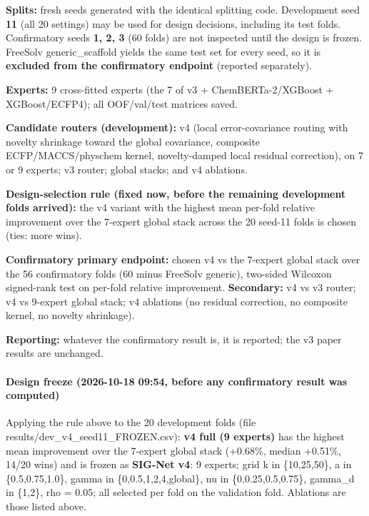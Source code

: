 \documentclass[11pt]{article}
\begin{document}
{\textbf{Splits:} fresh seeds generated with the identical splitting code. Development seed \textbf{11} (all 20 settings) may be used for design decisions, including its test folds. Confirmatory seeds \textbf{1, 2, 3} (60 folds) are not inspected until the design is frozen. FreeSolv generic\_scaffold yields the same test set for every seed, so it is \textbf{excluded from the confirmatory endpoint} (reported separately).

\textbf{Experts:} 9 cross-fitted experts (the 7 of v3 + ChemBERTa-2/XGBoost + XGBoost/ECFP4); all OOF/val/test matrices saved.

\textbf{Candidate routers (development):} v4 (local error-covariance routing with novelty shrinkage toward the global covariance, composite ECFP/MACCS/physchem kernel, novelty-damped local residual correction), on 7 or 9 experts; v3 router; global stacks; and v4 ablations.

\textbf{Design-selection rule (fixed now, before the remaining development folds arrived):} the v4 variant with the highest mean per-fold relative improvement over the 7-expert global stack across the 20 seed-11 folds is chosen (ties: more wins).

\textbf{Confirmatory primary endpoint:} chosen v4 vs the 7-expert global stack over the 56 confirmatory folds (60 minus FreeSolv generic), two-sided Wilcoxon signed-rank test on per-fold relative improvement. \textbf{Secondary:} v4 vs v3 router; v4 vs 9-expert global stack; v4 ablations (no residual correction, no composite kernel, no novelty shrinkage).

\textbf{Reporting:} whatever the confirmatory result is, it is reported; the v3 paper results are unchanged.

\paragraph*{Design freeze (2026-10-18 09:54, before any confirmatory result was computed)}
Applying the rule above to the 20 development folds (file results/dev\_v4\_seed11\_FROZEN.csv): \textbf{v4 full (9 experts)} has the highest mean improvement over the 7-expert global stack (+0.68\%, median +0.51\%, 14/20 wins) and is frozen as \textbf{SIG-Net v4}: 9 experts; grid k in \{10,25,50\}, a in \{0.5,0.75,1.0\}, gamma in \{0,0.5,1,2,4,global\}, nu in \{0,0.25,0.5,0.75\}, gamma\_d in \{1,2\}, rho = 0.05; all selected per fold on the validation fold. Ablations are those listed above.

}
\end{document}
